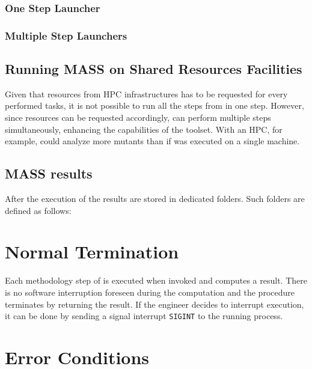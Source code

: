 \subsubsection{One Step Launcher}

\subsubsection{Multiple Step Launchers}
\label{sec:dama_launchers}

\subsection{Running MASS on Shared Resources Facilities}
\label{sec:dama_shared}

Given that resources from HPC infrastructures has to be requested for every performed tasks, it is not possible to run all the steps from \DAMA in one step.
However, since resources can be requested accordingly, \DAMA can perform multiple steps simultaneously, enhancing the capabilities of the toolset. With an HPC, for example, \DAMA could analyze more mutants than if \DAMA was executed on a single machine.

\subsection{MASS results}

After the execution of \DAMA the results are stored in dedicated folders. Such folders are defined as follows:


\section{Normal Termination}


Each methodology step of \DAMA is executed when invoked and computes a result. There is no software interruption foreseen during the computation and the procedure terminates by returning the result.
If the engineer decides to interrupt \DAMA execution, it can be done by sending a signal interrupt \texttt{SIGINT} to the running process.

\section{Error Conditions}

